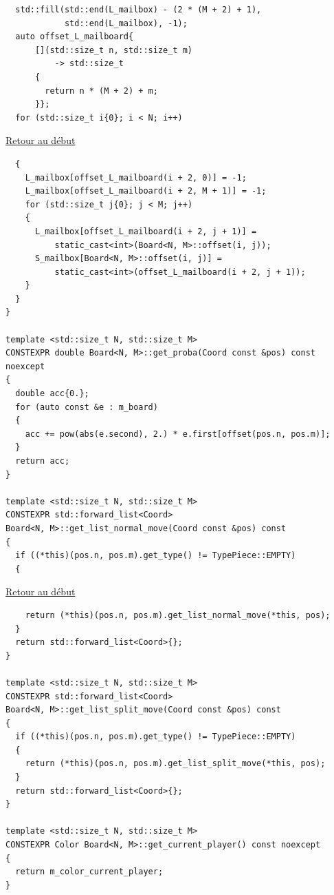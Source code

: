 {\begin{frame}[fragile]
\begin{verbatim}
  std::fill(std::end(L_mailbox) - (2 * (M + 2) + 1),
            std::end(L_mailbox), -1);
  auto offset_L_mailboard{
      [](std::size_t n, std::size_t m)
          -> std::size_t
      {
        return n * (M + 2) + m;
      }};
  for (std::size_t i{0}; i < N; i++)
\end{verbatim}
\end{frame}

\begin{frame}[fragile]
\hyperlink{conclusion}{Retour au début}\newline
\begin{verbatim}
  {
    L_mailbox[offset_L_mailboard(i + 2, 0)] = -1;
    L_mailbox[offset_L_mailboard(i + 2, M + 1)] = -1;
    for (std::size_t j{0}; j < M; j++)
    {
      L_mailbox[offset_L_mailboard(i + 2, j + 1)] =
          static_cast<int>(Board<N, M>::offset(i, j));
      S_mailbox[Board<N, M>::offset(i, j)] =
          static_cast<int>(offset_L_mailboard(i + 2, j + 1));
    }
  }
}

template <std::size_t N, std::size_t M>
CONSTEXPR double Board<N, M>::get_proba(Coord const &pos) const noexcept
{
  double acc{0.};
  for (auto const &e : m_board)
  {
    acc += pow(abs(e.second), 2.) * e.first[offset(pos.n, pos.m)];
  }
  return acc;
}

template <std::size_t N, std::size_t M>
CONSTEXPR std::forward_list<Coord>
Board<N, M>::get_list_normal_move(Coord const &pos) const
{
  if ((*this)(pos.n, pos.m).get_type() != TypePiece::EMPTY)
  {
\end{verbatim}
\end{frame}

\begin{frame}[fragile]
\hyperlink{conclusion}{Retour au début}\newline
\begin{verbatim}
    return (*this)(pos.n, pos.m).get_list_normal_move(*this, pos);
  }
  return std::forward_list<Coord>{};
}

template <std::size_t N, std::size_t M>
CONSTEXPR std::forward_list<Coord>
Board<N, M>::get_list_split_move(Coord const &pos) const
{
  if ((*this)(pos.n, pos.m).get_type() != TypePiece::EMPTY)
  {
    return (*this)(pos.n, pos.m).get_list_split_move(*this, pos);
  }
  return std::forward_list<Coord>{};
}

template <std::size_t N, std::size_t M>
CONSTEXPR Color Board<N, M>::get_current_player() const noexcept
{
  return m_color_current_player;
}


\end{verbatim}
\end{frame}}
